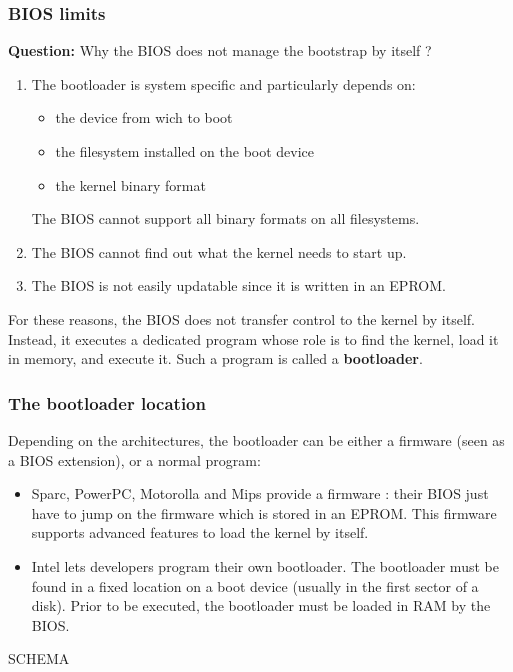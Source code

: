 %
%
%

\begin{frame}
  \frametitle{BIOS limits}

  {\bf Question:} Why the BIOS does not manage the bootstrap by itself ?

  \-

  \begin{enumerate}
  \item The bootloader is system specific and particularly depends on:

  \begin{itemize}
  \item the device from wich to boot
  \item the filesystem installed on the boot device
  \item the kernel binary format
  \end{itemize}

  The BIOS cannot support all binary formats on all filesystems.

  \-

  \item The BIOS cannot find out what the kernel needs to start up.

  \-

  \item The BIOS is not easily updatable since it is written in an EPROM.

  \end{enumerate}

  \-

  For these reasons, the BIOS does not transfer control to the kernel by itself. Instead, it executes a dedicated program whose role is to find the kernel, load it in memory, and execute it. Such a program is called a {\bf bootloader}.



\end{frame}

%
%
%

\begin{frame}
  \frametitle{The bootloader location}

  Depending on the architectures, the bootloader can be either a firmware (seen as a BIOS extension), or a normal program:

  \-

  \begin{itemize}
  \item Sparc, PowerPC, Motorolla and Mips provide a firmware : their BIOS just have to jump on the firmware which is stored in an EPROM. This firmware supports advanced features to load the kernel by itself.

  \-

  \item Intel lets developers program their own bootloader. The bootloader must be found in a fixed location on a boot device (usually in the first sector of a disk). Prior to be executed, the bootloader must be loaded in RAM by the BIOS.
  \end{itemize}

  \-

  SCHEMA

\end{frame}

